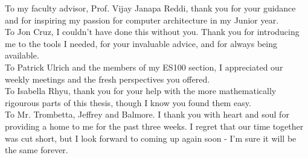 
To my faculty advisor, Prof. Vijay Janapa Reddi, thank you for your guidance and for inspiring my passion for computer architecture in my Junior year. \\

To Jon Cruz, I couldn't have done this without you. Thank you for introducing me to the tools I needed, for your invaluable advice, and for always being available.  \\

To Patrick Ulrich and the members of my ES100 section, I appreciated our weekly meetings and the fresh perspectives you offered.\\

To Isabella Rhyu, thank you for your help with the more mathematically rigourous parts of this thesis, though I know you found them easy. \\

To Mr. Trombetta, Jeffrey and Balmore. I thank you with heart and soul for providing a home to me for the past three weeks. I regret that our time together was cut short, but I look forward to coming up again soon - I'm sure it will be the same forever.   \\